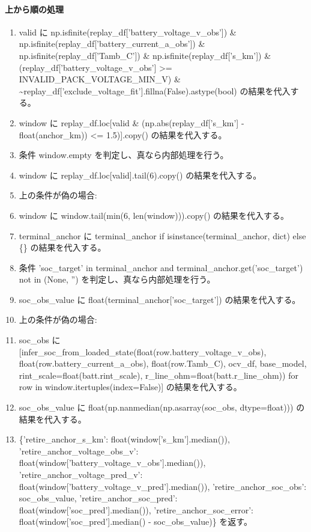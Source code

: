 \documentclass[a4paper,11pt]{article}
\begin{document}
            \paragraph{上から順の処理}
            \begin{enumerate}[leftmargin=1.8em]
            \item valid に np.isfinite(replay\_df['battery\_voltage\_v\_obs']) \& np.isfinite(replay\_df['battery\_current\_a\_obs']) \& np.isfinite(replay\_df['Tamb\_C']) \& np.isfinite(replay\_df['s\_km']) \& (replay\_df['battery\_voltage\_v\_obs'] >= INVALID\_PACK\_VOLTAGE\_MIN\_V) \& \textasciitilde{}replay\_df['exclude\_voltage\_fit'].fillna(False).astype(bool) の結果を代入する。
\item window に replay\_df.loc[valid \& (np.abs(replay\_df['s\_km'] - float(anchor\_km)) <= 1.5)].copy() の結果を代入する。
\item 条件 window.empty を判定し、真なら内部処理を行う。
\item   window に replay\_df.loc[valid].tail(6).copy() の結果を代入する。
\item   上の条件が偽の場合:
\item   window に window.tail(min(6, len(window))).copy() の結果を代入する。
\item terminal\_anchor に terminal\_anchor if isinstance(terminal\_anchor, dict) else \{\} の結果を代入する。
\item 条件 'soc\_target' in terminal\_anchor and terminal\_anchor.get('soc\_target') not in (None, '') を判定し、真なら内部処理を行う。
\item   soc\_obs\_value に float(terminal\_anchor['soc\_target']) の結果を代入する。
\item   上の条件が偽の場合:
\item   soc\_obs に [infer\_soc\_from\_loaded\_state(float(row.battery\_voltage\_v\_obs), float(row.battery\_current\_a\_obs), float(row.Tamb\_C), ocv\_df, base\_model, rint\_scale=float(batt.rint\_scale), r\_line\_ohm=float(batt.r\_line\_ohm)) for row in window.itertuples(index=False)] の結果を代入する。
\item   soc\_obs\_value に float(np.nanmedian(np.asarray(soc\_obs, dtype=float))) の結果を代入する。
\item \{'retire\_anchor\_s\_km': float(window['s\_km'].median()), 'retire\_anchor\_voltage\_obs\_v': float(window['battery\_voltage\_v\_obs'].median()), 'retire\_anchor\_voltage\_pred\_v': float(window['battery\_voltage\_v\_pred'].median()), 'retire\_anchor\_soc\_obs': soc\_obs\_value, 'retire\_anchor\_soc\_pred': float(window['soc\_pred'].median()), 'retire\_anchor\_soc\_error': float(window['soc\_pred'].median() - soc\_obs\_value)\} を返す。
            \end{enumerate}
\end{document}
